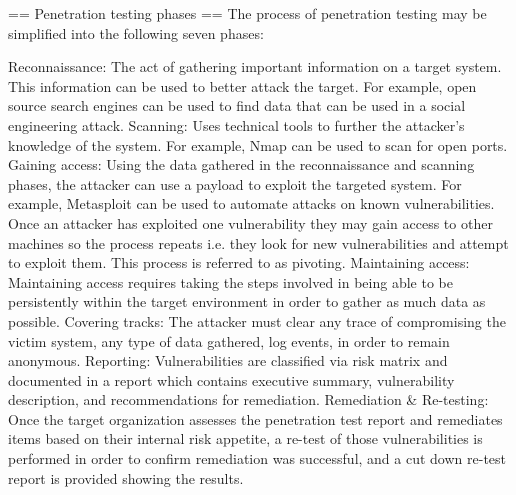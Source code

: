 == Penetration testing phases ==
The process of penetration testing may be simplified into the following seven phases:

Reconnaissance: The act of gathering important information on a target system. This information can be used to better attack the target. For example, open source search engines can be used to find data that can be used in a social engineering attack.
Scanning: Uses technical tools to further the attacker's knowledge of the system. For example, Nmap can be used to scan for open ports.
Gaining access: Using the data gathered in the reconnaissance and scanning phases, the attacker can use a payload to exploit the targeted system. For example, Metasploit can be used to automate attacks on known vulnerabilities. Once an attacker has exploited one vulnerability they may gain access to other machines so the process repeats i.e. they look for new vulnerabilities and attempt to exploit them. This process is referred to as pivoting.
Maintaining access: Maintaining access requires taking the steps involved in being able to be persistently within the target environment in order to gather as much data as possible.
Covering tracks: The attacker must clear any trace of compromising the victim system, any type of data gathered, log events, in order to remain anonymous.
Reporting: Vulnerabilities are classified via risk matrix and documented in a report which contains executive summary, vulnerability description, and recommendations for remediation.
Remediation \& Re-testing: Once the target organization assesses the penetration test report and remediates items based on their internal risk appetite, a re-test of those vulnerabilities is performed in order to confirm remediation was successful, and a cut down re-test report is provided showing the results.


